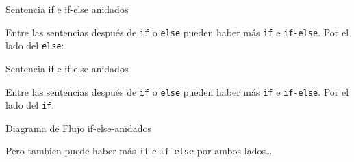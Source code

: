 \begin{frame}[fragile]{Sentencia if e if-else anidados}

Entre las sentencias después de \texttt{if} o \texttt{else} pueden haber
más \texttt{if} e \texttt{if-else}. Por el lado del \texttt{else}:

\begin{Shaded}
\begin{Highlighting}[]
 
    \NormalTok{\{}
    \NormalTok{\}}
      
        \NormalTok{\{}
        \NormalTok{\}}
          
\end{Highlighting}
\end{Shaded}

\end{frame}

\begin{frame}[fragile]{Sentencia if e if-else anidados}

Entre las sentencias después de \texttt{if} o \texttt{else} pueden haber
más \texttt{if} e \texttt{if-else}. Por el lado del \texttt{if}:

\begin{Shaded}
\begin{Highlighting}[]
 
    \NormalTok{\{}
     
        \NormalTok{\{}
        \NormalTok{\}}
        \NormalTok{\{}
        \NormalTok{\}}
    \NormalTok{\}}
 
\end{Highlighting}
\end{Shaded}

\end{frame}

\begin{frame}[fragile]{Diagrama de Flujo if-else-anidados}

Pero tambien puede haber más \texttt{if} e \texttt{if-else} por ambos
lados\ldots{}

\begin{Shaded}
\begin{Highlighting}[]
 
    \NormalTok{\{}
     
        \NormalTok{\{}
        \NormalTok{\}}
        \NormalTok{\{}
        \NormalTok{\}}
    \NormalTok{\}}
\end{Highlighting}
\end{Shaded}

\end{frame}

